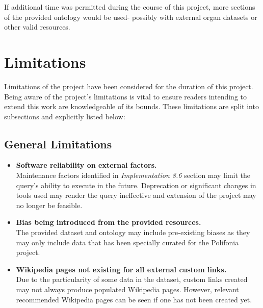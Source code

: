 If additional time was permitted during the course of this project, more sections of the provided ontology would be used- possibly with external organ datasets or other valid resources. 

\section{Limitations}
\hspace{0.5cm} Limitations of the project have been considered for the duration of this project. Being aware of the project's limitations is vital to ensure readers intending to extend this work are knowledgeable of its bounds. These limitations are split into subsections and explicitly listed below:

\subsection{General Limitations}
\begin{itemize}
    \item \textbf{Software reliability on external factors.} \\ Maintenance factors identified in \textit{Implementation 8.6} section may limit the query's ability to execute in the future. Deprecation or significant changes in tools used may render the query ineffective and extension of the project may no longer be feasible. 
    \item \textbf{Bias being introduced from the provided resources.} \\ The provided dataset and ontology may include pre-existing biases as they may only include data that has been specially curated for the Polifonia project. 
    \item \textbf{Wikipedia pages not existing for all external custom links.} \\ Due to the particularity of some data in the dataset, custom links created may not always produce populated Wikipedia pages. However, relevant recommended Wikipedia pages can be seen if one has not been created yet.  
\end{itemize}

